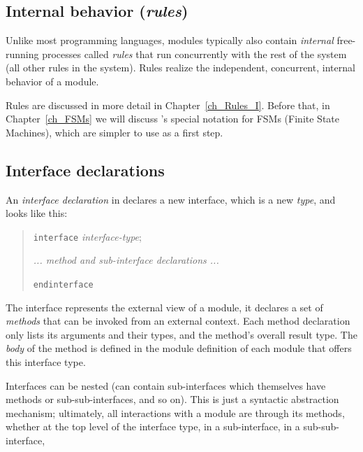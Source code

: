 
\subsection{Internal behavior (\emph{rules})}

\label{Sec_rules1}


Unlike most programming languages, {\BSV} modules typically also contain
\emph{internal} free-running processes called \emph{rules} that run
concurrently with the rest of the system (all other rules in the
system).  Rules realize the independent, concurrent, internal behavior
of a module.

Rules are discussed in more detail in Chapter~\ref{ch_Rules_I}.
Before that, in Chapter~\ref{ch_FSMs} we will discuss {\BSV}'s special
notation for FSMs (Finite State Machines), which are simpler to use as
a first step.


\subsection{Interface declarations}


An \emph{interface declaration} in {\BSV} declares a new interface, which
is a new {\BSV} \emph{type}, and looks like this:

\begin{quote}
{\tt interface} \emph{interface-type};

\hmm \emph{... method and sub-interface declarations ...}

{\tt endinterface}
\end{quote}

The interface represents the external view of a module, {\ie} it
declares a set of \emph{methods} that can be invoked from an external
context.  Each method declaration only lists its arguments and their
types, and the method's overall result type.  The \emph{body} of the
method is defined in the module definition of each module that offers
this interface type.

Interfaces can be nested (can contain sub-interfaces which themselves
have methods or sub-sub-interfaces, and so on).  This is just a
syntactic abstraction mechanism; ultimately, all interactions with a
module are through its methods, whether at the top level of the
interface type, in a sub-interface, in a sub-sub-interface, {\etc}

